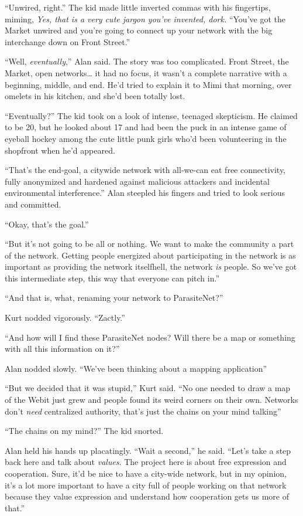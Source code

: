 ``Unwired, right.'' The kid made little inverted commas with his
fingertips, miming, \textit{Yes, that is a very cute jargon you've
invented, dork.} ``You've got the Market unwired and you're going to
connect up your network with the big interchange down on Front
Street.''

``Well, \textit{eventually},'' Alan said.  The story was too
complicated.  Front Street, the Market, open networks\ldots{}  it had no
focus, it wasn't a complete narrative with a beginning, middle, and
end.  He'd tried to explain it to Mimi that morning, over omelets in
his kitchen, and she'd been totally lost.

``Eventually?'' The kid took on a look of intense, teenaged
skepticism.  He claimed to be 20, but he looked about 17 and had been
the puck in an intense game of eyeball hockey among the cute little
punk girls who'd been volunteering in the shopfront when he'd
appeared.

``That's the end-goal, a citywide network with all-we-can eat free
connectivity, fully anonymized and hardened against malicious
attackers and incidental environmental interference.'' Alan steepled
his fingers and tried to look serious and committed.

``Okay, that's the goal.''

``But it's not going to be all or nothing.  We want to make the
community a part of the network.  Getting people energized about
participating in the network is as important as providing the network
itself\dash{}hell, the network \textit{is} people.  So we've got this
intermediate step, this way that everyone can pitch in.''

``And that is, what, renaming your network to ParasiteNet?''

Kurt nodded vigorously.  ``Zactly.''

``And how will I find these ParasiteNet nodes?  Will there be a map or
something with all this information on it?''

Alan nodded slowly.  ``We've been thinking about a mapping
application\dash{}''

``But we decided that it was stupid,'' Kurt said.  ``No one needed to
draw a map of the Web\dash{}it just grew and people found its weird
corners on their own.  Networks don't \textit{need} centralized
authority, that's just the chains on your mind talking\dash{}''

``The chains on my mind?'' The kid snorted.

Alan held his hands up placatingly.  ``Wait a second,'' he said. 
``Let's take a step back here and talk about \textit{values}.  The
project here is about free expression and cooperation.  Sure, it'd be
nice to have a city-wide network, but in my opinion, it's a lot more
important to have a city full of people working on that network
because they value expression and understand how cooperation gets us
more of that.''

